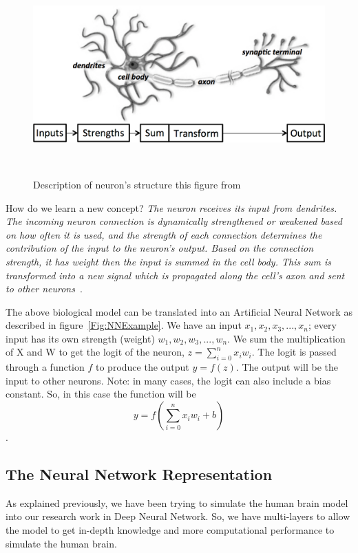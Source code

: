 \begin{figure}[!t] \includegraphics[width=\linewidth]{./Figures/Ch_2_Background/neuron_structure.png}
\caption{Description of neuron's structure this figure from~\cite{DLFundamentals}}
~\label{Fig:Neuron_Structure}
\end{figure}%
 
How do we learn a new concept? \textit{The neuron receives its input from dendrites. The incoming neuron connection is dynamically strengthened or weakened based on how often it is used, and the strength of each connection determines the contribution of the input to the neuron's output. Based on the connection strength, it has weight then the input is summed in the cell body. This sum is transformed into a new signal which is propagated along the cell's axon and sent to other neurons~\cite{DLFundamentals}}.

The above biological model can be translated into an Artificial Neural Network as described in figure~\ref{Fig:NNExample}. We have an input $x_1,x_2,x_3,...,x_n$; every input has its own strength (weight) $w_1,w_2,w_3,...,w_n$. We sum the multiplication of X and W to get the logit of the neuron, $z =  \sum_{i=0}^{n} x_i w_i $. The logit is passed through a function $f$ to produce the output $ y = f(z)$. The output will be the input to other neurons. Note: in many cases, the logit can also include a bias constant. So, in this case the function will be $$ y = f(\sum_{i=0}^{n} x_i w_i + b)$$.
 
\subsection{The Neural Network Representation}
As explained previously, we have been trying to simulate the human brain model into our research work in Deep Neural Network. So, we have multi-layers to allow the model to get in-depth knowledge and more computational performance to simulate the human brain. 

